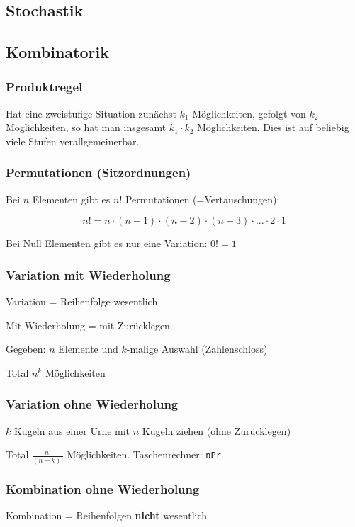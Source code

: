\begin{multicols}{2}
\section{Stochastik}

\subsection{Kombinatorik}

\subsubsection{Produktregel}
Hat eine zweistufige Situation zunächst $k_1$ Möglichkeiten, gefolgt
von $k_2$ Möglichkeiten, so hat man insgesamt $k_1\cdot{}k_2$
Möglichkeiten. Dies ist auf beliebig viele Stufen verallgemeinerbar.

\subsubsection{Permutationen (Sitzordnungen)}

Bei $n$ Elementen gibt es $n!$ Permutationen (=Vertauschungen):

\begin{definition}{}{}
$$n! = n\cdot{}(n-1)\cdot{}(n-2)\cdot{}(n-3)\cdot{} ... \cdot{}2\cdot{}1$$
\end{definition}

Bei Null Elementen gibt es nur eine Variation: $0! = 1$


\subsubsection{Variation mit Wiederholung}
Variation = Reihenfolge wesentlich

Mit Wiederholung = mit Zurücklegen

Gegeben: $n$ Elemente und $k$-malige Auswahl
(\zB Zahlenschloss)

Total $n^k$ Möglichkeiten

\subsubsection{Variation ohne Wiederholung}
$k$ Kugeln aus einer Urne mit $n$ Kugeln ziehen (ohne Zurücklegen)

Total $\frac{n!}{(n-k)!}$ Möglichkeiten. Taschenrechner: \texttt{nPr}. 

\subsubsection{Kombination ohne Wiederholung}
Kombination = Reihenfolgen \textbf{nicht} wesentlich


\end{multicols}
